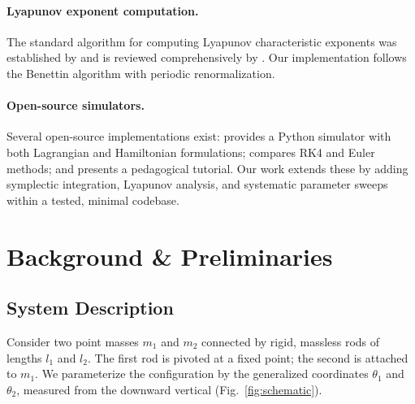 \documentclass[11pt,a4paper]{article}
\begin{document}
\paragraph{Lyapunov exponent computation.}
The standard algorithm for computing Lyapunov characteristic exponents was
established by \citet{benettin1980lyapunov} and is reviewed comprehensively by
\citet{skokos2010lyapunov}. Our implementation follows the Benettin algorithm
with periodic renormalization.

\paragraph{Open-source simulators.}
Several open-source implementations exist: \citet{dassencio_double_pendulum}
provides a Python simulator with both Lagrangian and Hamiltonian formulations;
\citet{cristello_double_pendulum} compares RK4 and Euler methods; and
\citet{scipython_double_pendulum} presents a pedagogical tutorial. Our work
extends these by adding symplectic integration, Lyapunov analysis, and
systematic parameter sweeps within a tested, minimal codebase.

\section{Background \& Preliminaries}\label{sec:background}

\subsection{System Description}

Consider two point masses $m_1$ and $m_2$ connected by rigid, massless rods
of lengths $l_1$ and $l_2$. The first rod is pivoted at a fixed point; the
second is attached to $m_1$. We parameterize the configuration by the
generalized coordinates $\theta_1$ and $\theta_2$, measured from the downward
vertical (Fig.~\ref{fig:schematic}).
\end{document}
